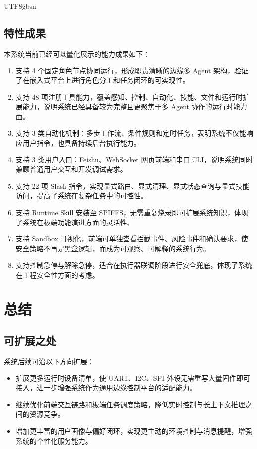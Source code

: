 \documentclass[a4paper,12pt]{article}
\begin{document}
\begin{CJK*}{UTF8}{gbsn}
\subsection{特性成果}
本系统当前已经可以量化展示的能力成果如下：
\begin{enumerate}
  \item 支持 4 个固定角色节点协同运行，形成职责清晰的边缘多 Agent 架构，验证了在嵌入式平台上进行角色分工和任务闭环的可实现性。
  \item 支持 48 项注册工具能力，覆盖感知、控制、自动化、技能、文件和运行时扩展能力，说明系统已经具备较为完整且更聚焦于多 Agent 协作的运行时能力面。
  \item 支持 3 类自动化机制：多步工作流、条件规则和定时任务，表明系统不仅能响应用户指令，也具备持续后台执行能力。
  \item 支持 3 类用户入口：Feishu、WebSocket 网页前端和串口 CLI，说明系统同时兼顾普通用户交互和开发调试需求。
  \item 支持 22 项 Slash 指令，实现显式路由、显式清理、显式状态查询与显式技能访问，提高了系统在复杂任务中的可控性。
  \item 支持 Runtime Skill 安装至 SPIFFS，无需重复烧录即可扩展系统知识，体现了系统在板端功能演进方面的灵活性。
  \item 支持 Sandbox 可视化，前端可单独查看拦截事件、风险事件和确认要求，使安全策略不再是黑盒逻辑，而成为可观察、可解释的系统行为。
  \item 支持控制急停与解除急停，适合在执行器联调阶段进行安全兜底，体现了系统在工程安全性方面的考虑。
\end{enumerate}

\section{总结}

\subsection{可扩展之处}
系统后续可沿以下方向扩展：
\begin{itemize}
  \item 扩展更多运行时设备清单，使 UART、I2C、SPI 外设无需重写大量固件即可接入，进一步增强系统作为通用边缘控制平台的适配能力。
  \item 继续优化前端交互链路和板端任务调度策略，降低实时控制与长上下文推理之间的资源竞争。
  \item 增加更丰富的用户画像与偏好闭环，实现更主动的环境控制与消息提醒，增强系统的个性化服务能力。
\end{itemize}


\end{CJK*}
\end{document}
